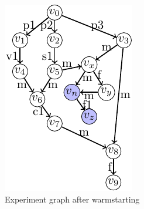 \begin{figure}[t]
\centering
\includegraphics{../images/tikz-standalone/warmstarting-example-final-eg}
\caption{Experiment graph after warmstarting} %
\label{fig-warmstarting}
\end{figure}

%


